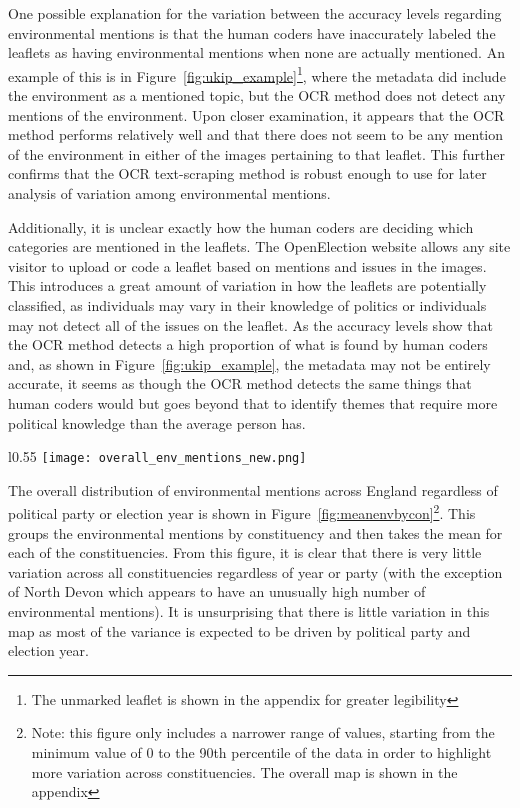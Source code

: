 \documentclass[12pt,letterpaper]{article}
\begin{document}


One possible explanation for the variation between the accuracy levels regarding environmental mentions is that the human coders have inaccurately labeled the leaflets as having environmental mentions when none are actually mentioned. An example of this is in Figure~\ref{fig:ukip_example}\footnote{The unmarked leaflet is shown in the appendix for greater legibility}, where the metadata did include the environment as a mentioned topic, but the OCR method does not detect any mentions of the environment. Upon closer examination, it appears that the OCR method performs relatively well and that there does not seem to be any mention of the environment in either of the images pertaining to that leaflet. This further confirms that the OCR text-scraping method is robust enough to use for later analysis of variation among environmental mentions. 


Additionally, it is unclear exactly how the human coders are deciding which categories are mentioned in the leaflets. The OpenElection website allows any site visitor to upload or code a leaflet based on mentions and issues in the images. This introduces a great amount of variation in how the leaflets are potentially classified, as individuals may vary in their knowledge of politics or individuals may not detect all of the issues on the leaflet. As the accuracy levels show that the OCR method detects a high proportion of what is found by human coders and, as shown in Figure~\ref{fig:ukip_example}, the metadata may not be entirely accurate, it seems as though the OCR method detects the same things that human coders would but goes beyond that to identify themes that require more political knowledge than the average person has.



\begin{wrapfigure}[23]{l}{0.55\textwidth}
	\centering
	\texttt{[image: overall\_env\_mentions\_new.png]}
	\caption{Mean Environmental Mentions By Constituency}
	\label{fig:meanenvbycon}
\end{wrapfigure}




The overall distribution of environmental mentions across England regardless of political party or election year is shown in Figure~\ref{fig:meanenvbycon}\footnote{Note: this figure only includes a narrower range of values, starting from the minimum value of 0 to the 90th percentile of the data in order to highlight more variation across constituencies. The overall map is shown in the appendix}. This groups the environmental mentions by constituency and then takes the mean for each of the constituencies. From this figure, it is clear that there is very little variation across all constituencies regardless of year or party (with the exception of North Devon which appears to have an unusually high number of environmental mentions). It is unsurprising that there is little variation in this map as most of the variance is expected to be driven by political party and election year. 
\end{document}
